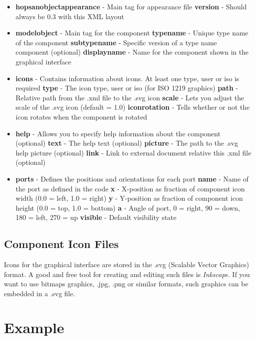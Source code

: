 \documentclass[a4paper,pdftex]{article}
\begin{document}
\begin{itemize}
\item \textbf{hopsanobjectappearance} - Main tag for appearance file
\subitem \textbf{version} - Should always be 0.3 with this XML layout
\item \textbf{modelobject} - Main tag for the component
\subitem \textbf{typename} - Unique type name of the component
\subitem \textbf{subtypename} - Specific version of a type name component (optional)
\subitem \textbf{displayname} - Name for the component shown in the graphical interface
\item \textbf{icons} - Contains information about icons. At least one type, user or iso is required
\subitem \textbf{type} - The icon type, user or iso (for ISO 1219 graphics)
\subitem \textbf{path} - Relative path from the .xml file to the .svg icon
\subitem \textbf{scale} - Lets you adjust the scale of the .svg icon (default = 1.0)
\subitem \textbf{iconrotation} - Tells whether or not the icon rotates when the component is rotated
\item \textbf{help} - Allows you to specify help information about the component (optional)
\subitem \textbf{text} - The help text (optional)
\subitem \textbf{picture} - The path to the .svg help picture (optional)
\subitem \textbf{link} - Link to external document relative this .xml file (optional) 
\item \textbf{ports} - Defines the positions and orientations for each port
\subitem \textbf{name} - Name of the port as defined in the code
\subitem \textbf{x} - X-position as fraction of component icon width (0.0 = left, 1.0 = right)
\subitem \textbf{y} - Y-position as fraction of component icon height (0.0 = top, 1.0 = bottom)
\subitem \textbf{a} - Angle of port, 0 = right, 90 = down, 180 = left, 270 = up
\subitem \textbf{visible} - Default visibility state
\end{itemize}

\subsection*{Component Icon Files}
Icons for the graphical interface are stored in the .svg (Scalable Vector Graphics) format. A good and free tool for creating and editing such files is \textit{Inkscape}. If you want to use bitmaps graphics, .jpg, .png or similar formats, such graphics can be embedded in a .svg file.

\section{Example}
\end{document}
